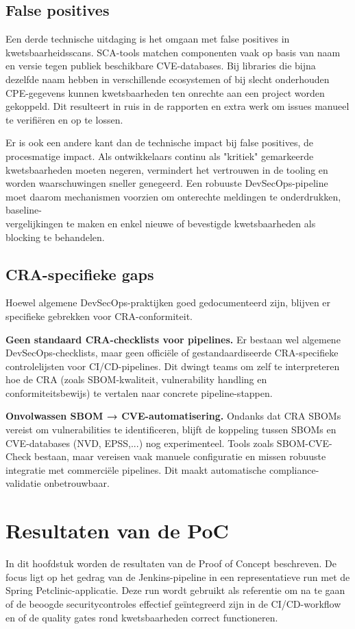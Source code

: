 \subsection{False positives}

Een derde technische uitdaging is het omgaan met false positives in kwetsbaarheidsscans. SCA-tools matchen componenten vaak op basis van naam en versie tegen publiek beschikbare CVE-databases. Bij libraries die bijna dezelfde naam hebben in verschillende ecosystemen of bij slecht onderhouden CPE-gegevens kunnen kwetsbaarheden ten onrechte aan een project worden gekoppeld. Dit resulteert in ruis in de rapporten en extra werk om issues manueel te verifiëren en op te lossen.

Er is ook een andere kant dan de technische impact bij false positives, de procesmatige impact. Als ontwikkelaars continu als "kritiek" gemarkeerde kwetsbaarheden moeten negeren, vermindert het vertrouwen in de tooling en worden waarschuwingen sneller genegeerd. Een robuuste DevSecOps-pipeline moet daarom mechanismen voorzien om onterechte meldingen te onderdrukken, baseline-\\vergelijkingen te maken en enkel nieuwe of bevestigde kwetsbaarheden als blocking te behandelen.

\subsection{CRA-specifieke gaps}

Hoewel algemene DevSecOps-praktijken goed gedocumenteerd zijn, blijven er specifieke gebrekken voor CRA-conformiteit.

\textbf{Geen standaard CRA-checklists voor pipelines.} Er bestaan wel algemene\\DevSecOps-checklists, maar geen officiële of gestandaardiseerde CRA-specifieke controlelijsten voor CI/CD-pipelines. Dit dwingt teams om zelf te interpreteren hoe de CRA (zoals SBOM-kwaliteit, vulnerability handling en conformiteitsbewijs) te vertalen naar concrete pipeline-stappen.

\textbf{Onvolwassen SBOM → CVE-automatisering.} Ondanks dat CRA SBOMs vereist om vulnerabilities te identificeren, blijft de koppeling tussen SBOMs en CVE-databases (NVD, EPSS,...) nog experimenteel. Tools zoals SBOM-CVE-Check bestaan, maar vereisen vaak manuele configuratie en missen robuuste integratie met commerciële pipelines. Dit maakt automatische compliance-validatie onbetrouwbaar.


\section{Resultaten van de PoC}
In dit hoofdstuk worden de resultaten van de Proof of Concept beschreven.
De focus ligt op het gedrag van de Jenkins-pipeline in een representatieve run met de Spring Petclinic-applicatie. Deze run wordt gebruikt als referentie om na te gaan of de beoogde securitycontroles effectief geïntegreerd zijn in de CI/CD-workflow en of de quality gates rond kwetsbaarheden correct functioneren.

